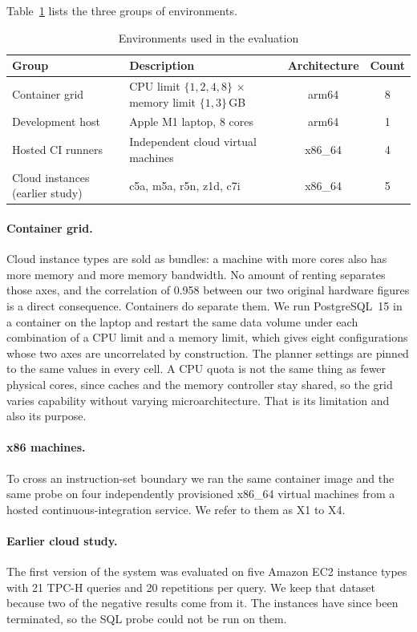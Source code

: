 \documentclass[runningheads]{llncs}
\begin{document}
Table~\ref{tab:env} lists the three groups of environments.

\begin{table}[t]
\centering
\caption{Environments used in the evaluation}
\label{tab:env}
\begin{tabular}{llcc}
\toprule
Group & Description & Architecture & Count \\
\midrule
Container grid & CPU limit $\{1,2,4,8\}$ $\times$ memory limit $\{1,3\}$\,GB & arm64 & 8 \\
Development host & Apple M1 laptop, 8 cores & arm64 & 1 \\
Hosted CI runners & Independent cloud virtual machines & x86\_64 & 4 \\
\midrule
Cloud instances (earlier study) & c5a, m5a, r5n, z1d, c7i & x86\_64 & 5 \\
\bottomrule
\end{tabular}
\end{table}

\paragraph{Container grid.}
Cloud instance types are sold as bundles: a machine with more cores also has
more memory and more memory bandwidth. No amount of renting separates those
axes, and the correlation of 0.958 between our two original hardware figures
is a direct consequence. Containers do separate them. We run PostgreSQL~15 in
a container on the laptop and restart the same data volume under each
combination of a CPU limit and a memory limit, which gives eight
configurations whose two axes are uncorrelated by construction. The planner
settings are pinned to the same values in every cell. A CPU quota is not the
same thing as fewer physical cores, since caches and the memory controller
stay shared, so the grid varies capability without varying microarchitecture.
That is its limitation and also its purpose.

\paragraph{x86 machines.}
To cross an instruction-set boundary we ran the same container image and the
same probe on four independently provisioned x86\_64 virtual machines from a
hosted continuous-integration service. We refer to them as X1 to X4.

\paragraph{Earlier cloud study.}
The first version of the system was evaluated on five Amazon EC2 instance
types with 21 TPC-H queries and 20 repetitions per query. We keep that
dataset because two of the negative results come from it. The instances have
since been terminated, so the SQL probe could not be run on them.
\end{document}
